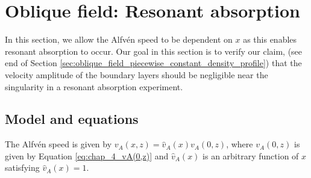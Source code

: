 
\section{Oblique field: Resonant absorption}
\label{sec:oblique_field_resonant_absorption}

In this section, we allow the Alfv\'en speed to be dependent on $x$ as this enables resonant absorption to occur. Our goal in this section is to verify our claim, (see end of Section \ref{sec:oblique_field_piecewise_constant_density_profile}) that the velocity amplitude of the boundary layers should be negligible near the singularity in a resonant absorption experiment.

\subsection{Model and equations}

The Alfv\'en speed is given by $v_A(x,z)=\hat{v}_A(x)v_A(0,z)$, where $v_A(0,z)$ is given by Equation \eqref{eq:chap_4_vA(0,z)} and $\hat{v}_A(x)$ is an arbitrary function of $x$ satisfying $\hat{v}_A(x)=1$. 

